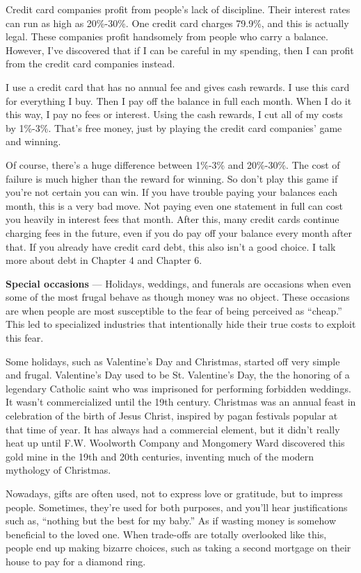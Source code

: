 Credit card companies profit from people's lack of discipline. Their interest rates can run as high as 20\%-30\%. One credit card charges 79.9\%, and this is actually legal.\cite{creditcards-high-interest} These companies profit handsomely from people who carry a balance. However, I've discovered that if I can be careful in my spending, then I can profit from the credit card companies instead.

I use a credit card that has no annual fee and gives cash rewards. I use this card for everything I buy. Then I pay off the balance in full each month. When I do it this way, I pay no fees or interest. Using the cash rewards, I cut all of my costs by 1\%-3\%. That's free money, just by playing the credit card companies' game and winning.

Of course, there's a huge difference between 1\%-3\% and 20\%-30\%. The cost of failure is much higher than the reward for winning. So don't play this game if you're not certain you can win. If you have trouble paying your balances each month, this is a very bad move. Not paying even one statement in full can cost you heavily in interest fees that month. After this, many credit cards continue charging fees in the future, even if you do pay off your balance every month after that. If you already have credit card debt, this also isn't a good choice. I talk more about debt in Chapter 4 and Chapter 6.

\textbf{Special occasions} --- Holidays, weddings, and funerals are occasions when even some of the most frugal behave as though money was no object. These occasions are when people are most susceptible to the fear of being perceived as ``cheap.'' This led to specialized industries that intentionally hide their true costs to exploit this fear.

Some holidays, such as Valentine's Day and Christmas, started off very simple and frugal. Valentine's Day used to be St. Valentine's Day, the the honoring of a legendary Catholic saint who was imprisoned for performing forbidden weddings. It wasn't commercialized until the 19th century.\cite{valentines-day} Christmas was an annual feast in celebration of the birth of Jesus Christ, inspired by pagan festivals popular at that time of year. It has always had a commercial element, but it didn't really heat up until F.W. Woolworth Company and Mongomery Ward discovered this gold mine in the 19th and 20th centuries, inventing much of the modern mythology of Christmas.\cite{remembering-woolworths}

Nowadays, gifts are often used, not to express love or gratitude, but to impress people. Sometimes, they're used for both purposes, and you'll hear justifications such as, ``nothing but the best for my baby.'' As if wasting money is somehow beneficial to the loved one. When trade-offs are totally overlooked like this, people end up making bizarre choices, such as taking a second mortgage on their house to pay for a diamond ring.

